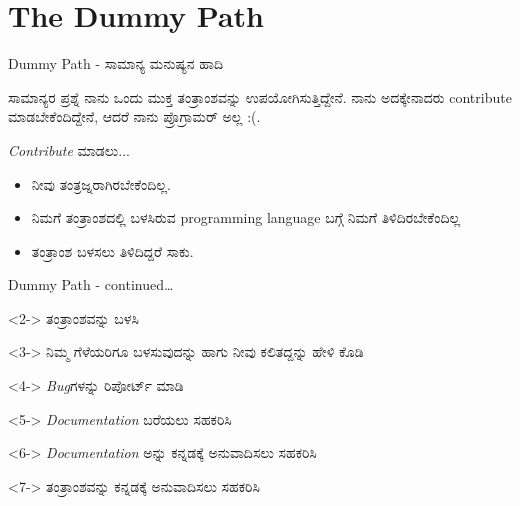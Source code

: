 \documentclass[slidestop,compress,brown]{beamer}
\newcommand\en[1]{{\english #1}}
\begin{document}
\section{\en{The Dummy Path}}
\begin{frame}{\en{Dummy Path} - ಸಾಮಾನ್ಯ ಮನುಷ್ಯನ ಹಾದಿ}
  \begin{block}{ಸಾಮಾನ್ಯರ ಪ್ರಶ್ನೆ}
    ನಾನು ಒಂದು ಮುಕ್ತ ತಂತ್ರಾಂಶವನ್ನು ಉಪಯೋಗಿಸುತ್ತಿದ್ದೇನೆ. ನಾನು ಅದಕ್ಕೇನಾದರು \en{contribute} ಮಾಡಬೇಕೆಂದಿದ್ದೇನೆ, ಆದರೆ ನಾನು ಪ್ರೊಗ್ರಾಮರ್ ಅಲ್ಲ :(.\linebreak[2]
  \end{block}
  \pause
  \en{\textit{Contribute}} ಮಾಡಲು...\linebreak[2]
  \begin{itemize}[<+->]
  \item<+-| alert@+> ನೀವು ತಂತ್ರಜ್ನರಾಗಿರಬೇಕೆಂದಿಲ್ಲ.
  \item<+-| alert@+> ನಿಮಗೆ ತಂತ್ರಾಂಶದಲ್ಲಿ ಬಳಸಿರುವ \en{programming language} ಬಗ್ಗೆ ನಿಮಗೆ ತಿಳಿದಿರಬೇಕೆಂದಿಲ್ಲ
  \item <+-| alert@+> ತಂತ್ರಾಂಶ ಬಳಸಲು ತಿಳಿದಿದ್ದರೆ ಸಾಕು.
  \end{itemize}  
\end{frame}

\begin{frame}{\en{Dummy Path - continued\ldots}}
  \begin{block}<2->
    {ತಂತ್ರಾಂಶವನ್ನು ಬಳಸಿ}
  \end{block}
  \begin{block}<3->
    {ನಿಮ್ಮ ಗೆಳೆಯರಿಗೂ ಬಳಸುವುದನ್ನು ಹಾಗು ನೀವು ಕಲಿತದ್ದನ್ನು ಹೇಳಿ ಕೊಡಿ}
  \end{block}
  \begin{block}<4->
    {\emph{\en{Bug}}ಗಳನ್ನು ರಿಪೋರ್ಟ್ ಮಾಡಿ}
  \end{block}
  \begin{block}<5->
    {\emph{\en{Documentation}} ಬರೆಯಲು ಸಹಕರಿಸಿ}
  \end{block}
  \begin{block}<6->
    {\emph{\en{Documentation}} ಅನ್ನು ಕನ್ನಡಕ್ಕೆ ಅನುವಾದಿಸಲು ಸಹಕರಿಸಿ}
  \end{block}
  \begin{block}<7->
    {ತಂತ್ರಾಂಶವನ್ನು ಕನ್ನಡಕ್ಕೆ ಅನುವಾದಿಸಲು ಸಹಕರಿಸಿ}
  \end{block}
\end{frame}
\end{document}
